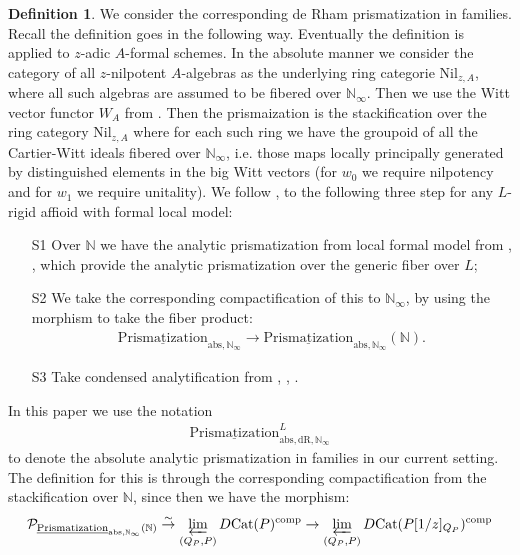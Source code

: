 \documentclass[12pt]{article}
\theoremstyle{definition}
\newtheorem{definition}{Definition}
\begin{document}
\begin{definition}
We consider the corresponding de Rham prismatization in families. Recall the definition goes in the following way. Eventually the definition is applied to $z$-adic $A$-formal schemes. In the absolute manner we consider the category of all $z$-nilpotent $A$-algebras as the underlying ring categorie $\mathrm{Nil}_{z,A}$, where all such algebras are assumed to be fibered over $\mathbb{N}_\infty$. Then we use the Witt vector functor $W_A$ from \cite{3LH}. Then the prismaization is the stackification over the ring category $\mathrm{Nil}_{z,A}$ where for each such ring we have the groupoid of all the Cartier-Witt ideals fibered over $\mathbb{N}_\infty$, i.e. those maps locally principally generated by distinguished elements in the big Witt vectors (for $w_0$ we require nilpotency and for $w_1$ we require unitality). We follow \cite{3S1}, \cite{3ALBRCS} to the following three step for any $L$-rigid affioid with formal local model:
\begin{itemize}
\item[S1] Over $\mathbb{N}$ we have the analytic prismatization from local formal model from \cite{3S1}, \cite{3ALBRCS}, which provide the analytic prismatization over the generic fiber over $L$;
\item[S2] We take the corresponding compactification of this to $\mathbb{N}_\infty$, by using the morphism to take the fiber product:
\begin{align}
\underline{\mathrm{Prismatization}}_{\mathrm{abs},\mathbb{N}_\infty}\rightarrow \underline{\mathrm{Prismatization}}_{\mathrm{abs},\mathbb{N}_\infty}(\mathbb{N}).
\end{align}
\item[S3] Take condensed analytification from \cite{3CS}, \cite{3CS1}, \cite{3CS2}.
\end{itemize} In this paper we use the notation 
\begin{align}
\underline{\mathrm{Prismatization}}^L_{\mathrm{abs},\mathrm{dR},\mathbb{N}_\infty}
\end{align}
to denote the absolute analytic prismatization in families in our current setting. The definition for this is through the corresponding compactification from the stackification over $\mathbb{N}$, since then we have the morphism:
\begin{align}
\mathcal{P}_{\underline{\mathrm{Prismatization}}_{\mathrm{abs},\mathbb{N}_\infty}(\mathbb{N})} \overset{\sim}{\rightarrow} \varprojlim_{(Q_P,P)} D\mathrm{Cat}(P)^\mathrm{comp}\rightarrow \varprojlim_{(Q_P,P)} D\mathrm{Cat}(P[1/z]_{Q_P})^\mathrm{comp}

\end{align}
\end{definition}
\end{document}
